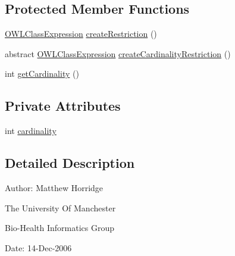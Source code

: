 \subsection*{Protected Member Functions}
\begin{DoxyCompactItemize}
\item 
\hyperlink{interfaceorg_1_1semanticweb_1_1owlapi_1_1model_1_1_o_w_l_class_expression}{O\-W\-L\-Class\-Expression} \hyperlink{classorg_1_1coode_1_1owlapi_1_1owlxmlparser_1_1_abstract_o_w_l_object_cardinality_element_handler_a899942fe534a52b3de97d276258c67e6}{create\-Restriction} ()
\item 
abstract \hyperlink{interfaceorg_1_1semanticweb_1_1owlapi_1_1model_1_1_o_w_l_class_expression}{O\-W\-L\-Class\-Expression} \hyperlink{classorg_1_1coode_1_1owlapi_1_1owlxmlparser_1_1_abstract_o_w_l_object_cardinality_element_handler_a02e56ea1687c3b2a7efd8e0fc510ad7a}{create\-Cardinality\-Restriction} ()
\item 
int \hyperlink{classorg_1_1coode_1_1owlapi_1_1owlxmlparser_1_1_abstract_o_w_l_object_cardinality_element_handler_a4819a460732c7d3b3c2a1084d5edd670}{get\-Cardinality} ()
\end{DoxyCompactItemize}
\subsection*{Private Attributes}
\begin{DoxyCompactItemize}
\item 
int \hyperlink{classorg_1_1coode_1_1owlapi_1_1owlxmlparser_1_1_abstract_o_w_l_object_cardinality_element_handler_adeef198592d28b67a2f5fffd884cce8d}{cardinality}
\end{DoxyCompactItemize}


\subsection{Detailed Description}
Author\-: Matthew Horridge\par
 The University Of Manchester\par
 Bio-\/\-Health Informatics Group\par
 Date\-: 14-\/\-Dec-\/2006\par
\par
 

